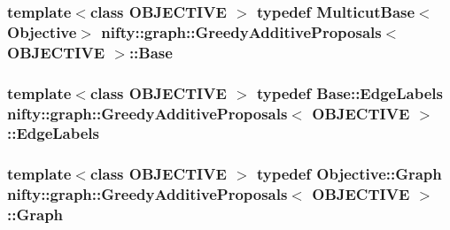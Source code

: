 \subsubsection[{Base}]{\setlength{\rightskip}{0pt plus 5cm}template$<$class O\+B\+J\+E\+C\+T\+I\+V\+E $>$ typedef {\bf Multicut\+Base}$<${\bf Objective}$>$ {\bf nifty\+::graph\+::\+Greedy\+Additive\+Proposals}$<$ O\+B\+J\+E\+C\+T\+I\+V\+E $>$\+::{\bf Base}}\label{classnifty_1_1graph_1_1GreedyAdditiveProposals_aa088cd2fe857e6fa292c96f7c9ffbc00}
\hypertarget{classnifty_1_1graph_1_1GreedyAdditiveProposals_a76d340937deac0d3b99e4a5df0a1cb6b}{}
\subsubsection[{Edge\+Labels}]{\setlength{\rightskip}{0pt plus 5cm}template$<$class O\+B\+J\+E\+C\+T\+I\+V\+E $>$ typedef {\bf Base\+::\+Edge\+Labels} {\bf nifty\+::graph\+::\+Greedy\+Additive\+Proposals}$<$ O\+B\+J\+E\+C\+T\+I\+V\+E $>$\+::{\bf Edge\+Labels}}\label{classnifty_1_1graph_1_1GreedyAdditiveProposals_a76d340937deac0d3b99e4a5df0a1cb6b}
\hypertarget{classnifty_1_1graph_1_1GreedyAdditiveProposals_a0dd1872c8c0b128ba99bd4e80de7e884}{}
\subsubsection[{Graph}]{\setlength{\rightskip}{0pt plus 5cm}template$<$class O\+B\+J\+E\+C\+T\+I\+V\+E $>$ typedef Objective\+::\+Graph {\bf nifty\+::graph\+::\+Greedy\+Additive\+Proposals}$<$ O\+B\+J\+E\+C\+T\+I\+V\+E $>$\+::{\bf Graph}}\label{classnifty_1_1graph_1_1GreedyAdditiveProposals_a0dd1872c8c0b128ba99bd4e80de7e884}
\hypertarget{classnifty_1_1graph_1_1GreedyAdditiveProposals_aeec70a0521e576f19b603759f4e67ff4}{}
